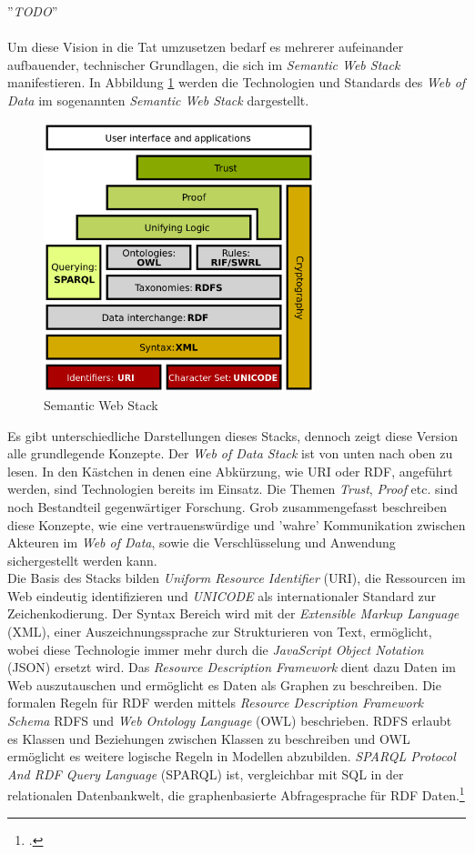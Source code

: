\documentclass[12pt,a4paper]{article}
\begin{document}
''\textit{TODO}''
\\
\\
Um diese Vision in die Tat umzusetzen bedarf es mehrerer aufeinander aufbauender, technischer Grundlagen, die sich im \textit{Semantic Web Stack} manifestieren.
In Abbildung \ref{fig:webstack} werden die Technologien und Standards des \textit{Web of Data} im sogenannten \textit{Semantic Web Stack} dargestellt.
\begin{figure}[h]
  \centering
	\includegraphics[width=0.7\textwidth]{img/web_stack.png}  
    \caption[Semantic Web Stack, \protect\url{en.wikipedia.org/wiki/Semantic_Web_Stack}, 29.12.2019.]{Semantic Web Stack}
  	\label{fig:webstack}
\end{figure}
Es gibt unterschiedliche Darstellungen dieses Stacks, dennoch zeigt diese Version alle grundlegende Konzepte. Der \textit{Web of Data Stack} ist von unten nach oben zu lesen. In den Kästchen in denen eine Abkürzung, wie URI oder RDF, angeführt werden, sind Technologien bereits im Einsatz. Die Themen \textit{Trust}, \textit{Proof} etc. sind noch Bestandteil gegenwärtiger Forschung. Grob zusammengefasst beschreiben diese Konzepte, wie eine vertrauenswürdige und 'wahre' Kommunikation zwischen Akteuren im \textit{Web of Data}, sowie die Verschlüsselung und Anwendung sichergestellt werden kann. 
\\
Die Basis des Stacks bilden \textit{Uniform Resource Identifier} (URI), die Ressourcen im Web eindeutig identifizieren und \textit{UNICODE} als internationaler Standard zur Zeichenkodierung. Der Syntax Bereich wird mit der \textit{Extensible Markup Language} (XML), einer Auszeichnungssprache zur Strukturieren von Text, ermöglicht, wobei diese Technologie immer mehr durch die \textit{JavaScript Object Notation} (JSON) ersetzt wird. Das \textit{Resource Description Framework} dient dazu Daten im Web auszutauschen und ermöglicht es Daten als Graphen zu beschreiben. Die formalen Regeln für RDF werden mittels \textit{Resource Description Framework Schema} RDFS und \textit{Web Ontology Language} (OWL) beschrieben. RDFS erlaubt es Klassen und Beziehungen zwischen Klassen zu beschreiben und OWL ermöglicht es weitere logische Regeln in Modellen abzubilden. \textit{SPARQL Protocol And RDF Query Language} (SPARQL) ist, vergleichbar mit SQL in der relationalen Datenbankwelt, die graphenbasierte Abfragesprache für RDF Daten.\footcite[][]{horrocks2005semantic}
\end{document}
